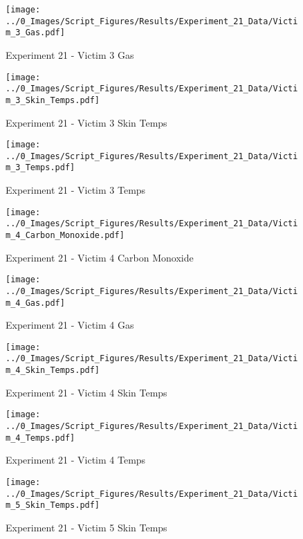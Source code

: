	\begin{figure}[H]
		\centering
		\texttt{[image: ../0\_Images/Script\_Figures/Results/Experiment\_21\_Data/Victim\_3\_Gas.pdf]}
		\caption[]{Experiment 21 - Victim 3 Gas}
	\end{figure}
 
	\clearpage

	\begin{figure}[H]
		\centering
		\texttt{[image: ../0\_Images/Script\_Figures/Results/Experiment\_21\_Data/Victim\_3\_Skin\_Temps.pdf]}
		\caption[]{Experiment 21 - Victim 3 Skin Temps}
	\end{figure}
 

	\begin{figure}[H]
		\centering
		\texttt{[image: ../0\_Images/Script\_Figures/Results/Experiment\_21\_Data/Victim\_3\_Temps.pdf]}
		\caption[]{Experiment 21 - Victim 3 Temps}
	\end{figure}
 
	\clearpage

	\begin{figure}[H]
		\centering
		\texttt{[image: ../0\_Images/Script\_Figures/Results/Experiment\_21\_Data/Victim\_4\_Carbon\_Monoxide.pdf]}
		\caption[]{Experiment 21 - Victim 4 Carbon Monoxide}
	\end{figure}
 

	\begin{figure}[H]
		\centering
		\texttt{[image: ../0\_Images/Script\_Figures/Results/Experiment\_21\_Data/Victim\_4\_Gas.pdf]}
		\caption[]{Experiment 21 - Victim 4 Gas}
	\end{figure}
 
	\clearpage

	\begin{figure}[H]
		\centering
		\texttt{[image: ../0\_Images/Script\_Figures/Results/Experiment\_21\_Data/Victim\_4\_Skin\_Temps.pdf]}
		\caption[]{Experiment 21 - Victim 4 Skin Temps}
	\end{figure}
 

	\begin{figure}[H]
		\centering
		\texttt{[image: ../0\_Images/Script\_Figures/Results/Experiment\_21\_Data/Victim\_4\_Temps.pdf]}
		\caption[]{Experiment 21 - Victim 4 Temps}
	\end{figure}
 
	\clearpage

	\begin{figure}[H]
		\centering
		\texttt{[image: ../0\_Images/Script\_Figures/Results/Experiment\_21\_Data/Victim\_5\_Skin\_Temps.pdf]}
		\caption[]{Experiment 21 - Victim 5 Skin Temps}
	\end{figure}
 

